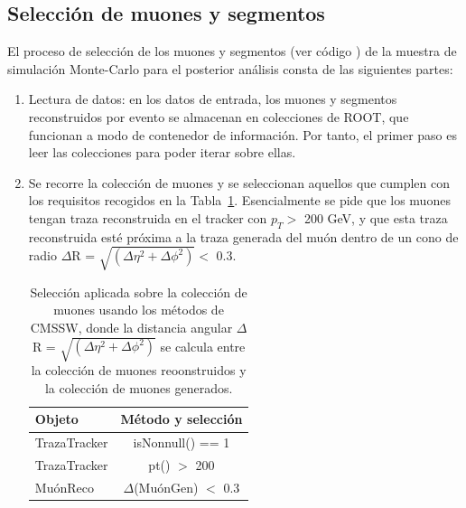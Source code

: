 \subsection{Selecci\'on de muones y segmentos}\label{sec:selection}

El proceso de selecci\'on de los muones y segmentos (ver c\'odigo \cite{analyzer}) de la muestra de simulaci\'on Monte-Carlo para el posterior an\'alisis consta de las siguientes partes: 

\begin{enumerate}
\item Lectura de datos: en los datos de entrada, los muones y segmentos reconstruidos por evento se almacenan en colecciones de ROOT, que funcionan a modo de contenedor de informaci\'on. Por tanto, el primer paso es leer las colecciones para poder iterar sobre ellas. 
\item Se recorre la colecci\'on de muones y se seleccionan aquellos que cumplen con los requisitos recogidos en la Tabla~\ref{tab:muon_sel}. Esencialmente se pide que los muones tengan traza reconstruida en el tracker con $p_{T} >$ 200 GeV, y que esta traza reconstruida est\'e pr\'oxima a la traza generada del mu\'on dentro de un cono de radio $\Delta$R = $\sqrt{(\Delta\eta^{2}+\Delta\phi^{2})} <$  0.3.

\begin{table}[htbp]
  \begin{center}
    {\normalsize
      \begin{tabular} {lc}
        \hline
        \hline
        Objeto                            & M\'etodo y selecci\'on                \\
        \hline
        TrazaTracker                      & isNonnull() == 1                       \\
        TrazaTracker                      & pt() $>$ 200                           \\
        Mu\'onReco                        & $\Delta$(Mu\'onGen) $<$ 0.3            \\
        \hline
      \end{tabular}
    }
    \caption{Selecci\'on aplicada sobre la colecci\'on de muones usando los m\'etodos de CMSSW, donde la distancia angular $\Delta$R = $\sqrt{(\Delta\eta^{2}+\Delta\phi^{2})}$ se calcula entre la colecci\'on de muones reoonstruidos y la colecci\'on de muones generados.}
    \label{tab:muon_sel}
  \end{center}
\end{table}


\end{enumerate}
